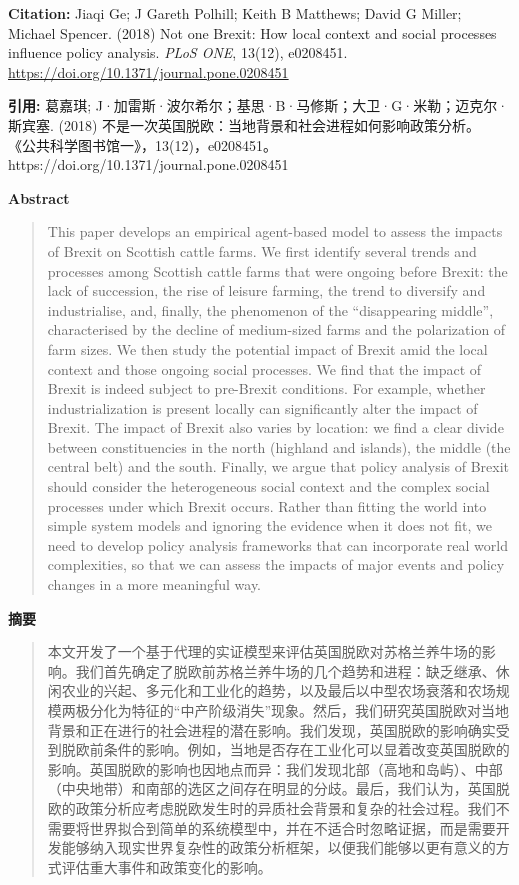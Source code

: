 \noindent\textbf{Citation:} Jiaqi Ge; J Gareth Polhill; Keith B Matthews; David G Miller; Michael Spencer. (2018) Not one Brexit: How local context and social processes influence policy analysis. \textit{PLoS ONE}, 13(12), e0208451. \url{https://doi.org/10.1371/journal.pone.0208451}

\vspace{0.5em}
\noindent\textbf{引用:} 葛嘉琪; J·加雷斯·波尔希尔；基思·B·马修斯；大卫·G·米勒；迈克尔·斯宾塞. (2018) 不是一次英国脱欧：当地背景和社会进程如何影响政策分析。 《公共科学图书馆一》，13(12)，e0208451。 https://doi.org/10.1371/journal.pone.0208451

\vspace{1.5em}
\noindent\textbf{Abstract}\par
\begin{quote}\small
This paper develops an empirical agent-based model to assess the impacts of Brexit on Scottish cattle farms. We first identify several trends and processes among Scottish cattle farms that were ongoing before Brexit: the lack of succession, the rise of leisure farming, the trend to diversify and industrialise, and, finally, the phenomenon of the “disappearing middle”, characterised by the decline of medium-sized farms and the polarization of farm sizes. We then study the potential impact of Brexit amid the local context and those ongoing social processes. We find that the impact of Brexit is indeed subject to pre-Brexit conditions. For example, whether industrialization is present locally can significantly alter the impact of Brexit. The impact of Brexit also varies by location: we find a clear divide between constituencies in the north (highland and islands), the middle (the central belt) and the south. Finally, we argue that policy analysis of Brexit should consider the heterogeneous social context and the complex social processes under which Brexit occurs. Rather than fitting the world into simple system models and ignoring the evidence when it does not fit, we need to develop policy analysis frameworks that can incorporate real world complexities, so that we can assess the impacts of major events and policy changes in a more meaningful way.
\end{quote}

\noindent\textbf{摘要}\par
\begin{quote}\small
本文开发了一个基于代理的实证模型来评估英国脱欧对苏格兰养牛场的影响。我们首先确定了脱欧前苏格兰养牛场的几个趋势和进程：缺乏继承、休闲农业的兴起、多元化和工业化的趋势，以及最后以中型农场衰落和农场规模两极分化为特征的“中产阶级消失”现象。然后，我们研究英国脱欧对当地背景和正在进行的社会进程的潜在影响。我们发现，英国脱欧的影响确实受到脱欧前条件的影响。例如，当地是否存在工业化可以显着改变英国脱欧的影响。英国脱欧的影响也因地点而异：我们发现北部（高地和岛屿）、中部（中央地带）和南部的选区之间存在明显的分歧。最后，我们认为，英国脱欧的政策分析应考虑脱欧发生时的异质社会背景和复杂的社会过程。我们不需要将世界拟合到简单的系统模型中，并在不适合时忽略证据，而是需要开发能够纳入现实世界复杂性的政策分析框架，以便我们能够以更有意义的方式评估重大事件和政策变化的影响。
\end{quote}


